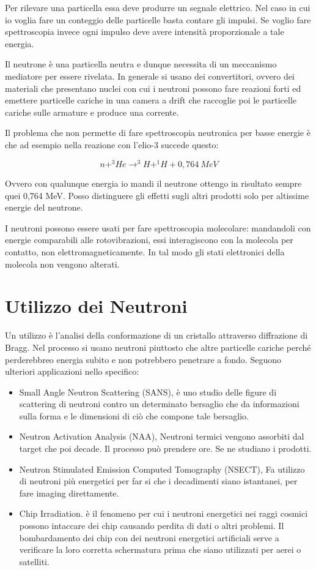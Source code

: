 \documentclass [a4paper, twoside] {book}
\begin{document}
Per rilevare una particella essa deve produrre un segnale elettrico. Nel caso in cui io voglia fare un conteggio delle particelle basta contare gli impulsi. Se voglio fare spettroscopia invece ogni impulso deve avere intensità proporzionale a tale energia.

Il neutrone è una particella neutra e dunque necessita di un meccanismo mediatore per essere rivelata. In generale si usano dei convertitori, ovvero dei materiali che presentano nuclei con cui i neutroni possono fare reazioni forti ed emettere particelle cariche in una camera a drift che raccoglie poi le particelle cariche sulle armature e produce una corrente. 

Il problema che non permette di fare spettroscopia neutronica per basse energie è che ad esempio nella reazione con l'elio-3 succede questo:

\begin{equation}
n+^3He \longrightarrow ^3H+^1H+0,764 \ MeV
\end{equation}

Ovvero con qualunque energia io mandi il neutrone ottengo in risultato sempre quei 0,764 MeV. Posso distinguere gli effetti sugli altri prodotti solo per altissime energie del neutrone.

I neutroni possono essere usati per fare spettroscopia molecolare: mandandoli con energie comparabili alle rotovibrazioni, essi interagiscono con la molecola per contatto, non elettromagneticamente. In tal modo gli stati elettronici della molecola non vengono alterati. 

\section{Utilizzo dei Neutroni}

Un utilizzo è l'analisi della conformazione di un cristallo attraverso diffrazione di Bragg. Nel processo si usano neutroni piuttosto che altre particelle cariche perché perderebbreo energia subito e non potrebbero penetrare a fondo. 
Seguono ulteriori applicazioni nello specifico:

\begin{itemize}
\item Small Angle Neutron Scattering (SANS), è uno studio delle figure di scattering di neutroni contro un determinato bersaglio che da informazioni sulla forma e le dimensioni di ciò che compone tale bersaglio.
\item Neutron Activation Analysis (NAA), Neutroni termici vengono assorbiti dal target che poi decade. Il processo può prendere ore. Se ne studiano i prodotti.
\item Neutron Stimulated Emission Computed Tomography (NSECT), Fa utilizzo di neutroni più energetici per far si che i decadimenti siano istantanei, per fare imaging direttamente.
\item Chip Irradiation. è il fenomeno per cui i neutroni energetici nei raggi cosmici possono intaccare dei chip causando perdita di dati o altri problemi. Il bombardamento dei chip con dei neutroni energetici artificiali serve a verificare la loro corretta schermatura 
prima che siano utilizzati per aerei o satelliti.
\end{itemize}
\end{document}

